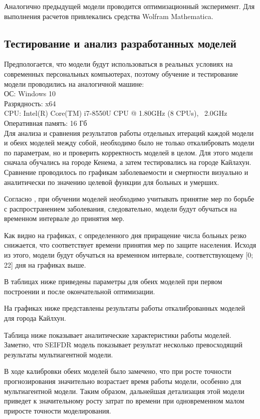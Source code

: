 Аналогично предыдущей модели проводится оптимизационный эксперимент. Для выполнения расчетов привлекались средства Wolfram Mathematica.

\subsection{Тестирование и анализ разработанных моделей}

Предпологается, что модели будут использоваться в реальных условиях на современных персональных компьютерах, поэтому обучение и тестирование модели проводились на аналогичной машине: \\
ОС: Windows 10 \\
Разрядность: x64 \\
CPU: Intel(R) Core(TM) i7-8550U CPU @ 1.80GHz (8 CPUs), ~2.0GHz \\
Оперативная память: 16 Гб \\

Для анализа и сравнения результатов работы отдельных итераций каждой модели и обеих моделей между собой, необходимо было не только откалибровать модели по параметрам, но и проверить корректность моделей в целом. Для этого модели сначала обучались на  городе Кенема, а затем тестировались на городе Кайлахун. Сравнение проводилось по графикам заболеваемости и смертности визуально  и аналитически по значению целевой функции для больных и умерших. 

Согласно %
, при обучении моделей необходимо учитывать принятие мер по борьбе с распространением заболевания, следовательно, модели будут обучаться на временном интервале до принятия мер.

Как видно на графиках, с определенного дня приращение числа больных резко снижается, что соответствует времени принятия мер по защите населения. Исходя из этого, модели будут обучаться на временном интервале, соответствующему  [0; 22] дня на графиках выше.

В таблицах ниже приведены параметры для обеих моделей при первом построении и после окончательной оптимизации.


На графиках ниже представлены результаты работы откалиброванных моделей для города Кайлхун. 


Таблица ниже показывает аналитические характеристики работы моделей. Заметно, что SEIFDR  модель показывает результат несколько превосходящий результаты мультиагентной модели.

В ходе калибровки обеих моделей было замечено, что при росте точности прогнозирования значительно возрастает время работы модели, особенно для мультиагентной модели. Таким образом, дальнейшая детализация этой модели приведет к значительному росту затрат по времени при одновременном малом приросте точности моделирования. 




